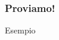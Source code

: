 \begin{frame}[fragile]
  \frametitle{Proviamo!}
  
 \begin{exampleblock}{Esempio}
    
 \end{exampleblock}

\end{frame}
 
